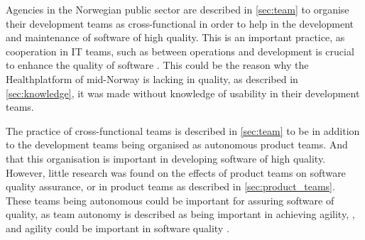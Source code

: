 
Agencies in the Norwegian public sector are described in \autoref{sec:team} to organise their development teams as cross-functional in order to help in the development and maintenance of software of high quality. This is an important practice, as cooperation in IT teams, such as between operations and development is crucial to enhance the quality of software \cite{aw_2019}. This could be the reason why the Healthplatform of mid-Norway is lacking in quality, as described in \autoref{sec:knowledge}, it was made without knowledge of usability in their development teams.

The practice of cross-functional teams is described in \autoref{sec:team} to be in addition to the development teams being organised as autonomous product teams. And that this organisation is important in developing software of high quality. However, little research was found on the effects of product teams on software quality assurance, or in product teams as described in \autoref{sec:product_teams}. These teams being autonomous could be important for assuring software of quality, as team autonomy is described as being important in achieving agility, \cite{gl_2010}, and agility could be important in software quality \cite{mh_2004}.


